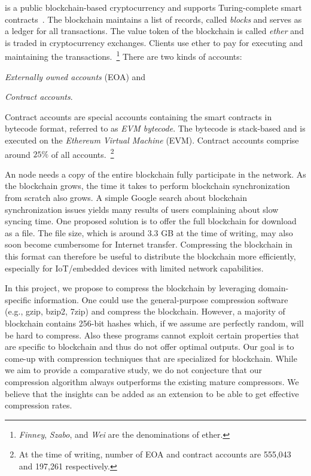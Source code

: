 
\eth{} is a public blockchain-based cryptocurrency and supports Turing-complete smart contracts~\cite{ethereum}.
The blockchain maintains a list of records, called \emph{blocks} and serves as a ledger for all transactions.
The value token of the blockchain is called \emph{ether} and 
is traded in cryptocurrency exchanges.
Clients use ether to pay for executing and maintaining the transactions.~\footnote{
\emph{Finney}, \emph{Szabo}, and \emph{Wei} are the denominations of ether.}
There are two kinds of \eth{} accounts: 
\renewcommand\labelenumi{(\theenumi)}
\begin{enumerate*}
	\item \emph{Externally owned accounts} (EOA) and
	\item \emph{Contract accounts}.
\end{enumerate*}
Contract accounts are special accounts containing the smart contracts in bytecode format, referred to as \emph{EVM bytecode}.
The bytecode is stack-based and is executed on the \emph{Ethereum Virtual Machine} (EVM).
Contract accounts comprise around $25\%$ of all \eth{} accounts.~\footnote{
At the time of writing, number of EOA and contract accounts are 555,043 and 197,261 respectively.}  


An \eth{} node needs a copy of the entire blockchain fully participate in the network. As the blockchain grows, the time it takes to perform blockchain synchronization from scratch also grows. A simple Google search about \eth{} blockchain synchronization issues yields many results of users complaining about slow syncing time. One proposed solution is to offer the full blockchain for download as a file. The file size, which is around 3.3 GB at the time of writing, may also soon become cumbersome for Internet transfer. Compressing the blockchain in this format can therefore be useful to distribute the blockchain more efficiently, especially for IoT/embedded devices with limited network capabilities.

In this project, we propose to compress the \eth{} blockchain by leveraging domain-specific information.
One could use the general-purpose compression software (e.g., gzip, bzip2, 7zip) and compress the blockchain.
However, a majority of blockchain contains 256-bit hashes which, if we assume are perfectly random, will be hard to compress.
Also these programs cannot exploit certain properties that are specific to blockchain and thus do not offer optimal outputs.
Our goal is to come-up with compression techniques that  are specialized for blockchain.
While we aim to provide a comparative study, we do not conjecture that our compression algorithm always outperforms the existing mature compressors.
We believe that the insights can be added as an extension to be able to get effective compression rates.   

